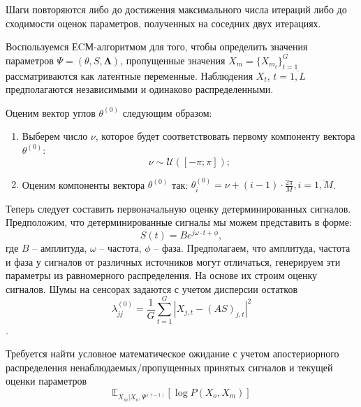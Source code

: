 \documentclass[11pt]{article}
\newcommand{\Expect}{\mathbb{E}}
\begin{document}
Шаги повторяются либо до достижения максимального числа итераций либо до сходимости оценок параметров, полученных на соседних двух итерациях.
\clearpage
\begin{center}
\fontsize{16}{20}\selectfont {}
\end{center}
Воспользуемся ЕCМ-алгоритмом для того, чтобы определить значения параметров $\Psi = (\theta, S, \mathbf{\Lambda})$, пропущенные значения $X_m=\{X_{m_t}\}_{t=1}^G$ рассматриваются как латентные переменные. Наблюдения $X_t$, $t=\overline{1,L}$ предполагаются независимыми и одинаково распределенными.
\begin{center}
\fontsize{14}{18}\selectfont {}
\end{center}
Оценим вектор углов $\theta^{(0)}$ следующим образом:
\begin{enumerate}
\item
Выберем число $\nu$, которое будет соответствовать первому компоненту вектора $\theta^{(0)}$:
$$
\nu \sim \mathcal{U}([-\pi;\pi]);
$$
\item
Оценим компоненты вектора $\theta^{(0)}$ так:  $\theta^{(0)}_i = \nu + (i-1)\cdot \frac{2\pi}{M}, i = \overline{1,M}$.
\end{enumerate}
Теперь следует составить первоначальную оценку детерминированных сигналов. Предположим, что детерминированные сигналы мы можем представить в форме:
\begin{equation}
S(t) = Be^{j\omega \cdot t + \phi},
\end{equation}
где $B$ -- амплитуда, $\omega$ -- частота, $\phi$ -- фаза.
Предполагаем, что амплитуда, частота и фаза у сигналов от различных источников могут отличаться, генерируем эти параметры из равномерного распределения. На основе их строим оценку сигналов.
Шумы на сенсорах задаются  с учетом дисперсии остатков
\begin{equation}
\lambda^{(0)}_{jj} = \frac{1}{G} \sum_{t=1}^G |X_{j,t} - (AS)_{j,t}|^2
\end{equation}.
\begin{center}
\fontsize{14}{18}\selectfont {}
\end{center}
Требуется найти условное математическое ожидание с учетом апостериорного распределения ненаблюдаемых/пропущенных принятых сигналов и текущей оценки параметров
\begin{equation}
 \Expect_{X_m|X_o, \Psi^{(\tau-1)}}[\log P(X_o, X_m)]
\end{equation}
\end{document}
